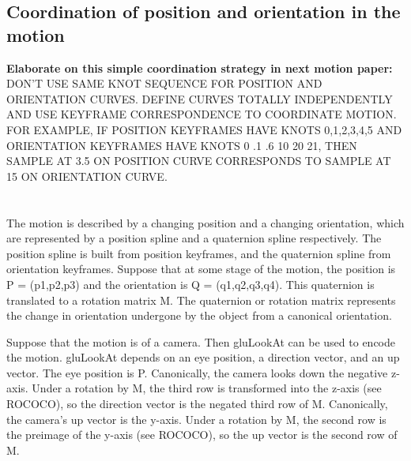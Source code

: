 \documentclass[12pt]{article}
\begin{document}
\subsection{Coordination of position and orientation in the motion}

{\bf Elaborate on this simple coordination strategy in next motion paper:}
DON'T USE SAME KNOT SEQUENCE FOR POSITION AND ORIENTATION CURVES.
DEFINE CURVES TOTALLY INDEPENDENTLY AND USE KEYFRAME CORRESPONDENCE TO
COORDINATE MOTION.
FOR EXAMPLE, IF POSITION KEYFRAMES HAVE KNOTS 0,1,2,3,4,5 AND 
ORIENTATION KEYFRAMES HAVE KNOTS 0 .1 .6 10 20 21, THEN
SAMPLE AT 3.5 ON POSITION CURVE CORRESPONDS TO SAMPLE AT 15 ON ORIENTATION CURVE.

\clearpage

\section{}

The motion is described by a changing position and a changing orientation,
which are represented by a position spline and a quaternion spline respectively.
The position spline is built from position keyframes, and the quaternion spline
from orientation keyframes.
Suppose that at some stage of the motion, the position is P = (p1,p2,p3) and the
orientation is Q = (q1,q2,q3,q4).
This quaternion is translated to a rotation matrix M.
The quaternion or rotation matrix represents the change in orientation undergone by
the object from a canonical orientation.

Suppose that the motion is of a camera.
Then gluLookAt can be used to encode the motion.
gluLookAt depends on an eye position, a direction vector, and an up vector.
The eye position is P.
Canonically, the camera looks down the negative z-axis.
Under a rotation by M, the third row is transformed into the z-axis (see ROCOCO),
so the direction vector is the negated third row of M.
Canonically, the camera's up vector is the y-axis.
Under a rotation by M, the second row is the preimage of the y-axis (see ROCOCO),
so the up vector is the second row of M.
\end{document}
